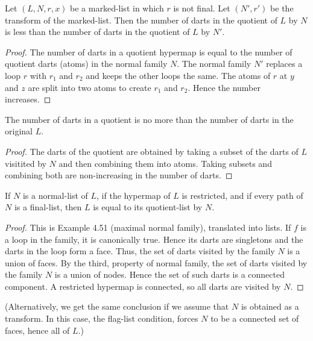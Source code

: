 \begin{lemma}  Let $(L,N,r,x)$ be a marked-list in which $r$ is not final.
Let $(N',r')$ be the transform of the marked-list.  Then the number of darts in the
quotient of $L$ by $N$ is less than the number of darts in the quotient of $L$ by $N'$.
\end{lemma}

\begin{proof}  The number of darts in a quotient hypermap is equal
to the number of quotient darts (atoms) in the normal family $N$.
The normal family $N'$ replaces a loop $r$ with $r_1$ and $r_2$
and keeps the other loops the same.  The atoms of $r$ at
$y$ and $z$ are split into two atoms to create $r_1$ and $r_2$.
Hence the number increases.
\end{proof}


\begin{lemma}  The number of darts in a quotient is no more than
the number of darts in the original $L$.
\end{lemma}

\begin{proof} The darts of the quotient  are obtained by taking a subset
of the darts of $L$ visitited by $N$ and then combining them into
atoms.  Taking subsets and combining both are non-increasing
in the number of darts.  
\end{proof}


\begin{lemma} If $N$ is a normal-list of $L$, if the hypermap of $L$ is restricted,
and if every path of $N$
is a final-list, then $L$ is equal to its quotient-list by $N$.
\end{lemma}

\begin{proof} This is Example 4.51 (maximal normal family), translated into lists.
If $f$ is a loop in the family, it is canonically true.  Hence its
darts are singletons and the darts in the loop form a face.  Thus,
the set of darts visited by the family $N$ is a union of faces.
By the third, property of normal family, the set of darts visited by
the family $N$ is a union of nodes.  Hence the set of such darts is
a connected component.  A restricted hypermap is connected,
so all darts are visited by $N$.  
\end{proof}

(Alternatively, we get the same conclusion if we assume that $N$ is obtained as a transform.  In this case,
the flag-list condition, forces $N$ to be a connected set of faces, hence all of $L$.)

